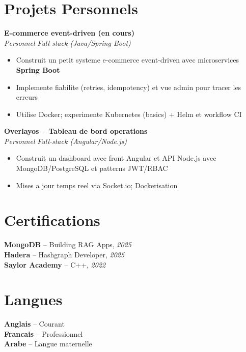 \documentclass[10pt,a4paper]{article}
\begin{document}
\vspace{4pt}
\section*{Projets Personnels}
{\small
\textbf{E-commerce event-driven (en cours)}\\[1pt]
\textit{Personnel} \hfill \textit{Full-stack (Java/Spring Boot)}
\begin{itemize}
  \item Construit un petit systeme e-commerce event-driven avec microservices \textbf{Spring Boot}
  \item Implemente fiabilite (retries, idempotency) et vue admin pour tracer les erreurs
  \item Utilise Docker; experimente Kubernetes (basics) + Helm et workflow CI
\end{itemize}

\vspace{2pt}
\textbf{Overlayos -- Tableau de bord operations}\\[1pt]
\textit{Personnel} \hfill \textit{Full-stack (Angular/Node.js)}
\begin{itemize}
  \item Construit un dashboard avec front Angular et API Node.js avec MongoDB/PostgreSQL et patterns JWT/RBAC
  \item Mises a jour temps reel via Socket.io; Dockerisation
\end{itemize}
}

\vspace{3pt}
\section*{Certifications}
{\small
\textbf{MongoDB} -- Building RAG Apps, \textit{2025}\\[1pt]
\textbf{Hadera} -- Hashgraph Developer, \textit{2025}\\[1pt]
\textbf{Saylor Academy} -- C++, \textit{2022}
}

\section*{Langues}
{\small
\textbf{Anglais} -- Courant\\[1pt]
\textbf{Francais} -- Professionnel\\[1pt]
\textbf{Arabe} -- Langue maternelle
}
\end{document}
